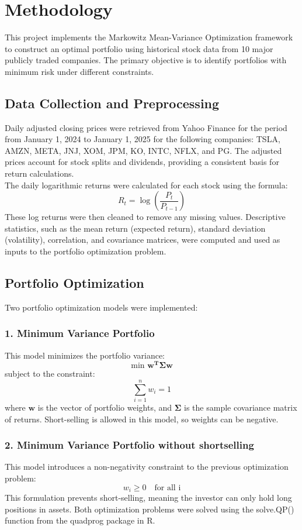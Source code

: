 \documentclass[11pt]{article}
\begin{document}
\section{Methodology}
This project implements the Markowitz Mean-Variance Optimization framework to construct an optimal portfolio using historical stock data from 10 major publicly traded companies. The primary objective is to identify portfolios with minimum risk under different constraints.

\subsection*{Data Collection and Preprocessing}
Daily adjusted closing prices were retrieved from Yahoo Finance for the period from January 1, 2024 to January 1, 2025 for the following companies: TSLA, AMZN, META, JNJ, XOM, JPM, KO, INTC, NFLX, and PG. The adjusted prices account for stock splits and dividends, providing a consistent basis for return calculations. \\
The daily logarithmic returns were calculated for each stock using the formula:
\[R_t=\log \left (\frac{P_t}{P_{t-1}} \right )\]
These log returns were then cleaned to remove any missing values. Descriptive statistics, such as the mean return (expected return), standard deviation (volatility), correlation, and covariance matrices, were computed and used as inputs to the portfolio optimization problem.

\subsection*{Portfolio Optimization}
Two portfolio optimization models were implemented:

\subsubsection*{1. Minimum Variance Portfolio}
This model minimizes the portfolio variance:
\[\text{min } \mathbf{w^T\Sigma w}\]
subject to the constraint:
\[\sum_{i=1}^n w_i=1\]
where $\mathbf{w}$ is the vector of portfolio weights, and $\mathbf{\Sigma}$ is the sample covariance matrix of returns. Short-selling is allowed in this model, so weights can be negative.

\subsubsection*{2. Minimum Variance Portfolio without shortselling}
This model introduces a non-negativity constraint to the previous optimization problem:
\[w_i \geq 0 \quad \text{for all i}\]
This formulation prevents short-selling, meaning the investor can only hold long positions in assets.\newline
Both optimization problems were solved using the solve.QP() function from the quadprog package in R.
\end{document}
